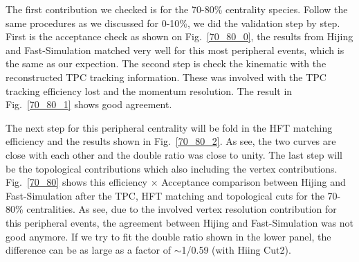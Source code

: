 The first contribution we checked is for the 70-80\% centrality species. Follow the same procedures as we discussed for 0-10\%, we did the validation step by step. First is the acceptance check as shown on Fig.~\ref{70_80_0}, the results from Hijing and Fast-Simulation matched very well for this most peripheral events, which is the same as our expection. The second step is check the kinematic with the reconstructed TPC tracking information. These was involved with the TPC tracking efficiency lost and the momentum resolution. The result in Fig.~\ref{70_80_1} shows good agreement.

The next step for this peripheral centrality will be fold in the HFT matching efficiency and the results shown in Fig.~\ref{70_80_2}. As see, the two curves are close with each other and the double ratio was close to unity. The last step will be the topological contributions which also including the vertex contributions. Fig.~\ref{70_80} shows this efficiency $\times$ Acceptance comparison between Hijing and Fast-Simulation after the TPC, HFT matching and topological cuts for the 70-80\% centralities. As see, due to the involved vertex resolution contribution for this peripheral events, the agreement between Hijing and Fast-Simulation was not good anymore. If we try to fit the double ratio shown in the lower panel, the difference can be as large as a factor of $\sim$1/0.59 (with Hiing Cut2).


